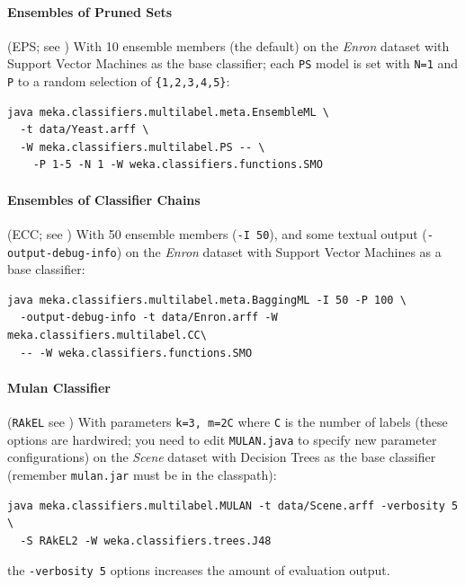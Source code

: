 \documentclass[11pt]{article}
\begin{document}
\paragraph{Ensembles of Pruned Sets} (EPS; see \cite{EPS}) With 10 ensemble members (the default) on the \textit{Enron} dataset with Support Vector Machines as the base classifier; each \texttt{PS} model is set with \texttt{N=1} and \texttt{P} to a random selection of \texttt{\{1,2,3,4,5\}}:

\begin{lstlisting}
java meka.classifiers.multilabel.meta.EnsembleML \
  -t data/Yeast.arff \
  -W meka.classifiers.multilabel.PS -- \
    -P 1-5 -N 1 -W weka.classifiers.functions.SMO
\end{lstlisting}

\paragraph{Ensembles of Classifier Chains} (ECC; see \cite{ECC2}) With 50 ensemble members (\texttt{-I 50}), and some textual output (\texttt{-output-debug-info}) on the \textit{Enron} dataset with Support Vector Machines as a base classifier:
\begin{lstlisting}
java meka.classifiers.multilabel.meta.BaggingML -I 50 -P 100 \
  -output-debug-info -t data/Enron.arff -W meka.classifiers.multilabel.CC\ 
  -- -W weka.classifiers.functions.SMO
\end{lstlisting}

\paragraph{Mulan Classifier} (\texttt{RAkEL} see \cite{RAKEL}) With parameters \texttt{\texttt{k=3}, \texttt{m=2C}} where \texttt{C} is the number of labels (these options are hardwired; you need to edit \texttt{MULAN.java} to specify new parameter configurations) on the \textit{Scene} dataset with Decision Trees as the base classifier (remember {\texttt{mulan.jar} must be in the classpath}):
\begin{lstlisting}
java meka.classifiers.multilabel.MULAN -t data/Scene.arff -verbosity 5 \ 
  -S RAkEL2 -W weka.classifiers.trees.J48
\end{lstlisting}
the \texttt{-verbosity 5} options increases the amount of evaluation output.

\end{document}
